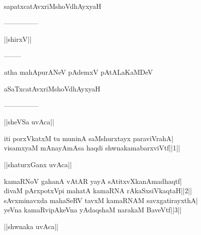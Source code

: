 \documentclass{article}
\begin{document}
\begin{center}
sapatxcatAvxriMshoVdhAyxyaH
\end{center}

\begin{center}
---------------
\end{center}

\begin{center}
||shirxV||
\end{center}

\begin{center}
--------
\end{center}

\begin{center}
atha mahApurANeV pAdemxV pAtALaKaMDeV
\end{center}

\begin{center}
aSaTxcatAvxriMshoVdhAyxyaH
\end{center}

\begin{center}
---------------
\end{center}

\begin{center}
||sheVSa uvAca||
\end{center}

iti porxVkatxM tu muninA saMshurxtayx paraviVrahA|\\
visamxyaM mAnayAmAsa haqdi shwnakamabarxviVtf||1||\\

\begin{center}
||shaturxGanx uvAca||
\end{center}

kamaRNoV gahanA vAtAR yayA  sAtitxvXkanAmadhaqtf|\\
divaM pArxpotxVpi mahatA kamaRNA rAkaSxsiVkaqtaH||2||\\
sAvxminavxda mahaSeRV tavxM kamaRNAM savxgatirayxthA|\\
yeVna kamaRvipAkeVna yAdaqshaM narakaM BaveVtf||3||\\

\begin{center}
||shwnaka uvAca||
\end{center}
\end{document}
